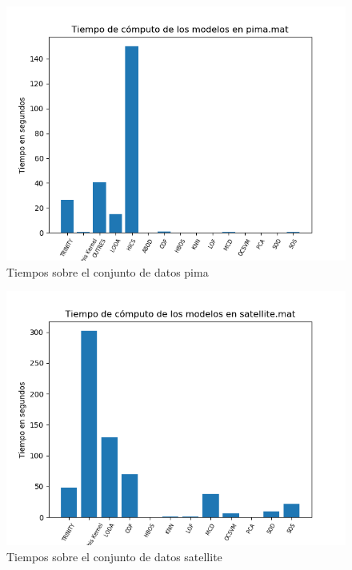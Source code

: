 \begin{figure}[H]
	\centering
	\label{pima_times}
	\includegraphics[scale=0.7]{imagenes/imgs-exp1/times/pima}
	\caption{Tiempos sobre el conjunto de datos pima}
\end{figure}

\begin{figure}[H]
	\centering
	\label{satellite_times}
	\includegraphics[scale=0.7]{imagenes/imgs-exp1/times/satellite}
	\caption{Tiempos sobre el conjunto de datos satellite}
\end{figure}

